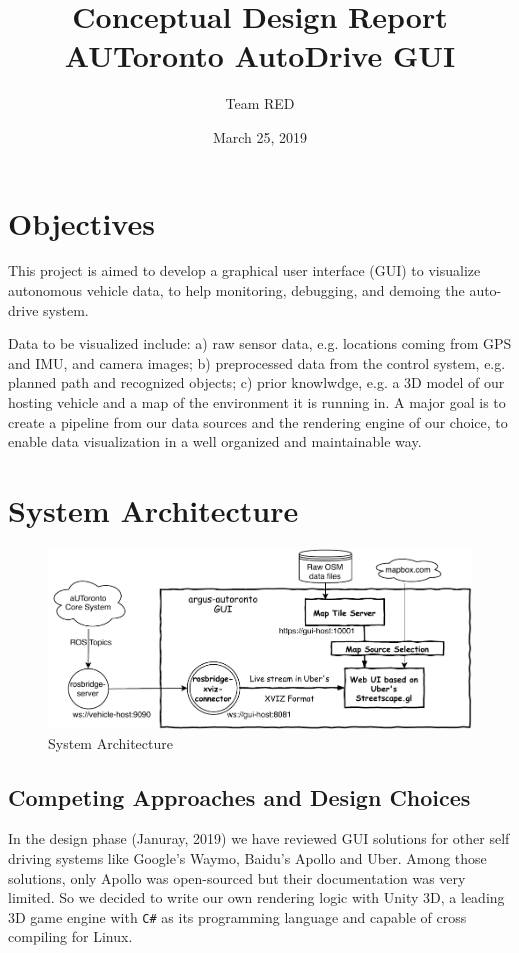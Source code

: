 \documentclass{article}
\title{Conceptual Design Report \\
\large AUToronto AutoDrive GUI}
\author{Team RED}
\date{March 25, 2019}
\begin{document}
\maketitle

\section{Objectives}

This project is aimed to develop a graphical user interface (GUI) to visualize autonomous vehicle data, to help monitoring, debugging, and demoing the auto-drive system.

Data to be visualized include: a) raw sensor data, e.g. locations coming from GPS and IMU, and camera images; b) preprocessed data from the control system, e.g. planned path and recognized objects; c) prior knowlwdge, e.g. a 3D model of our hosting vehicle and a map of the environment it is running in. A major goal is to create a pipeline from our data sources and the rendering engine of our choice, to enable data visualization in a well organized and maintainable way.

\section{System Architecture}

\begin{figure}[htb]
  \centering
  \includegraphics[width=0.7\linewidth]{argus-overview.pdf}
  \caption{System Architecture \cite{github}}
  \label{fig:sys-arch}
\end{figure}

\subsection{Competing Approaches and Design Choices}

In the design phase (Januray, 2019) we have reviewed GUI solutions for other self driving systems like Google's Waymo, Baidu's Apollo and Uber. Among those solutions, only Apollo was open-sourced but their documentation was very limited. So we decided to write our own rendering logic with Unity 3D, a leading 3D game engine with \verb!C#! as its programming language and capable of cross compiling for Linux.
\end{document}
